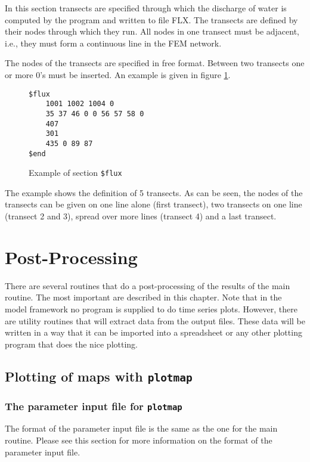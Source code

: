 \documentclass{report}
\begin{document}
In this section transects are specified through which the discharge
of water is computed by the program and written to file FLX.
The transects are defined by their nodes through which they run.
All nodes in one transect must be adjacent, i.e., they must form a
continuous line in the FEM network.

The nodes of the transects are specified in free format. Between
two transects one or more 0's must be inserted. An example is given in
figure \ref{fig:fluxexample}.

\begin{figure}[ht]
\begin{verbatim}
$flux
	1001 1002 1004 0
	35 37 46 0 0 56 57 58 0
	407
	301
	435 0 89 87
$end
\end{verbatim}
\caption{Example of section {\tt \$flux}}
\label{fig:fluxexample}
\end{figure}

The example shows the definition of 5 transects. As can be seen, the 
nodes of the transects can be given on one line alone (first transect),
two transects on one line (transect 2 and 3), spread over more lines
(transect 4) and a last transect.


\chapter{Post-Processing}


There are several routines that do a post-processing of the results of the 
main routine. The most important are described in this chapter.
Note that in the model framework no program is supplied to do
time series plots. However, there are utility routines that will extract
data from the output files. These data will be written in a way
that it can be imported into a spreadsheet or any other plotting
program that does the nice plotting.


\section{Plotting of maps with {\tt plotmap}}

\subsection{The parameter input file for {\tt plotmap}}

The format of the parameter input file is the same as the one for
the main routine. Please see this section for more information
on the format of the parameter input file.
\end{document}
